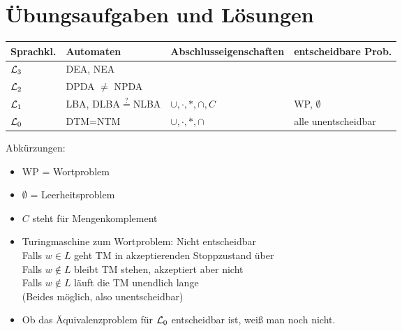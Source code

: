 
\chapter{Übungsaufgaben und Lösungen}

\begin{tabular}{l|l|l|l}
	Sprachkl. & Automaten & Abschlusseigenschaften & entscheidbare Prob.\\ \hline
	$\mathcal{L}_3$ & DEA, NEA & \\
	$\mathcal{L}_2$ & DPDA $\neq$ NPDA & \\
	$\mathcal{L}_1$ & LBA, DLBA$\overset{?}{=}$NLBA & $\cup,\cdot,\ast,\cap,C$ & WP, $\emptyset$\\
	$\mathcal{L}_0$ & DTM=NTM & $\cup,\cdot,\ast,\cap$ & alle unentscheidbar\\ 
\end{tabular}

Abkürzungen:
\begin{itemize}
	\item WP = Wortproblem
	\item $\emptyset$ = Leerheitsproblem
	\item $C$ steht für Mengenkomplement
\end{itemize}

\begin{itemize}
	\item Turingmaschine zum Wortproblem: Nicht entscheidbar\\
	Falls $w\in L$ geht TM in akzeptierenden Stoppzustand über\\
	Falls $w\not\in L$ bleibt TM stehen, akzeptiert aber nicht\\
	Falls $w\not\in L$ läuft die TM unendlich lange\\
	(Beides möglich, also unentscheidbar)
	\item Ob das Äquivalenzproblem für $\mathcal{L}_0$ entscheidbar ist, weiß man noch nicht.
\end{itemize}













